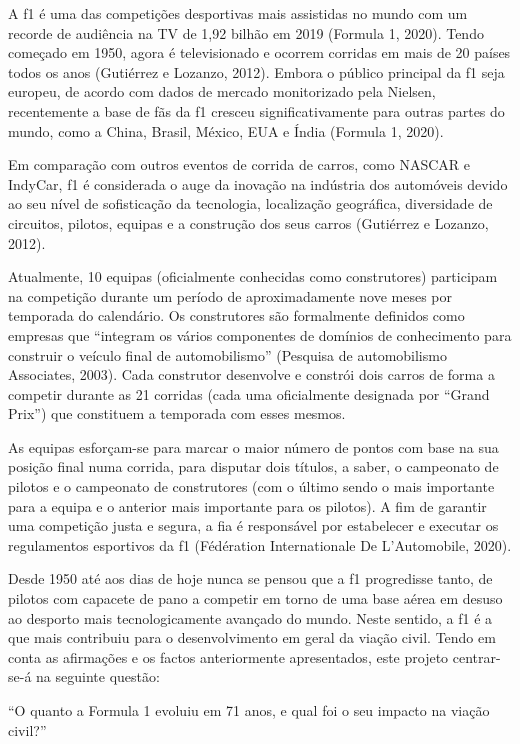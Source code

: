 \documentclass{report}
\begin{document}
A \ac{f1} é uma das competições desportivas mais assistidas no mundo com um recorde de audiência na TV de 1,92 bilhão em 2019 (Formula 1, 2020). Tendo começado em 1950, agora é televisionado e ocorrem corridas em mais de 20 países todos os anos (Gutiérrez e Lozanzo, 2012). Embora o público principal da \ac{f1} seja europeu, de acordo com dados de mercado monitorizado pela Nielsen, recentemente a base de fãs da \ac{f1} cresceu significativamente para outras partes do mundo, como a China, Brasil, México, EUA e Índia (Formula 1, 2020). 


Em comparação com outros eventos de corrida de carros, como NASCAR e IndyCar, \ac{f1} é considerada o auge da inovação na indústria dos automóveis devido ao seu nível de sofisticação da tecnologia, localização geográfica, diversidade de circuitos, pilotos, equipas e a construção dos seus carros (Gutiérrez e Lozanzo, 2012).


 Atualmente, 10 equipas (oficialmente conhecidas como construtores) participam na competição durante um período de aproximadamente nove meses por temporada do calendário. Os construtores são formalmente definidos como empresas que “integram os vários componentes de domínios de conhecimento para construir o veículo final de automobilismo” (Pesquisa de automobilismo Associates, 2003). Cada construtor desenvolve e constrói dois carros de forma a competir durante as 21 corridas (cada uma oficialmente designada por “Grand Prix”) que constituem a temporada com esses mesmos. 
 
 
 As equipas esforçam-se para marcar o maior número de pontos com base na sua posição final numa corrida, para disputar dois títulos, a saber, o campeonato de pilotos e o campeonato de construtores (com o último sendo o mais importante para a equipa e o anterior mais importante para os pilotos). A fim de garantir uma competição justa e segura, a \ac{fia} é responsável por estabelecer e executar os regulamentos esportivos da \ac{f1} (Fédération Internationale De L’Automobile, 2020).


Desde 1950 até aos dias de hoje nunca se pensou que a \ac{f1} progredisse tanto, de pilotos com capacete de pano a competir em torno de uma base aérea em desuso ao desporto mais tecnologicamente avançado do mundo. Neste sentido, a \ac{f1} é a que mais contribuiu para o desenvolvimento em geral da viação civil. Tendo em conta as afirmações e os factos anteriormente apresentados, este projeto centrar-se-á na seguinte questão:
\begin{center}
“O quanto a Formula 1 evoluiu em 71 anos, e qual foi o seu impacto na viação civil?”
\end{center}
\end{document}
